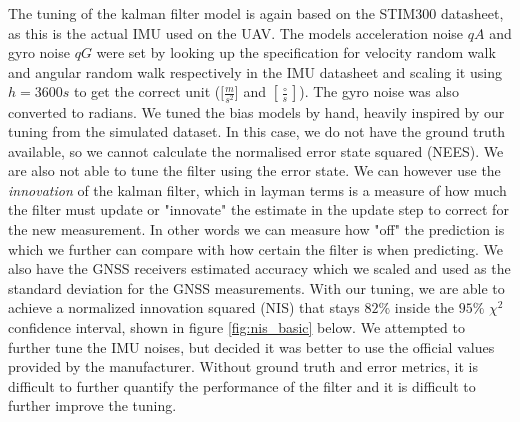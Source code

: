 The tuning of the kalman filter model is again based on the STIM300 datasheet, as this is the actual IMU used on the UAV. The models acceleration noise $qA$ and gyro noise $qG$ were set by looking up the specification for velocity random walk and angular random walk respectively in the IMU datasheet and scaling it using $h = 3600s$ to get the correct unit ($[\frac{m}{s^2}$] and $[\frac{\circ}{s}]$). The gyro noise was also converted to radians. We tuned the bias models by hand, heavily inspired by our tuning from the simulated dataset. In this case, we do not have the ground truth available, so we cannot calculate the normalised error state squared (NEES). We are also not able to tune the filter using the error state. We can however use the \textit{innovation} of the kalman filter, which in layman terms is a measure of how much the filter must update or "innovate" the estimate in the update step to correct for the new measurement. In other words we can measure how "off" the prediction is which we further can compare with how certain the filter is when predicting. We also have the GNSS receivers estimated accuracy which we scaled and used as the standard deviation for the GNSS measurements. With our tuning, we are able to achieve a normalized innovation squared (NIS) that stays $82\%$ inside the $95\%$ $\chi^2$ confidence interval, shown in figure \ref{fig:nis_basic} below. We attempted to further tune the IMU noises, but decided it was better to use the official values provided by the manufacturer. Without ground truth and error metrics, it is difficult to further quantify the performance of the filter and it is difficult to further improve the tuning. 

